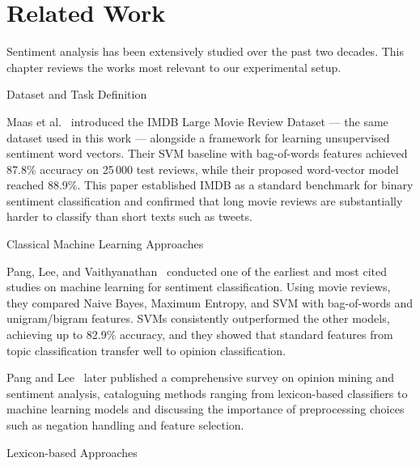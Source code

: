 \documentclass[12pt,reqno,twoside]{amsbook}
\makeatletter
\def\section{\@startsection{section}{1}%
      \z@{.5\linespacing\@plus.7\linespacing}{.25\linespacing}%
      {\normalfont\bfseries\flushleft}}
\theoremstyle{plain}
\numberwithin{equation}{chapter}
\numberwithin{section}{chapter}
\makeatother
\begin{document}
\chapter{Related Work}\label{ch:related}

\noindent Sentiment analysis has been extensively studied over the past two decades.
This chapter reviews the works most relevant to our experimental setup.

\section{Dataset and Task Definition}

\noindent Maas et al.~\cite{maas2011} introduced the IMDB Large Movie Review
Dataset --- the same dataset used in this work --- alongside a framework for
learning unsupervised sentiment word vectors.
Their SVM baseline with bag-of-words features achieved 87.8\% accuracy on
25\,000 test reviews, while their proposed word-vector model reached 88.9\%.
This paper established IMDB as a standard benchmark for binary sentiment
classification and confirmed that long movie reviews are substantially harder
to classify than short texts such as tweets.

\section{Classical Machine Learning Approaches}

\noindent Pang, Lee, and Vaithyanathan~\cite{pang2002} conducted one of the
earliest and most cited studies on machine learning for sentiment classification.
Using movie reviews, they compared Naive Bayes, Maximum Entropy, and SVM with
bag-of-words and unigram/bigram features.
SVMs consistently outperformed the other models, achieving up to 82.9\% accuracy,
and they showed that standard features from topic classification transfer well to
opinion classification.

Pang and Lee~\cite{pang2008} later published a comprehensive survey on opinion
mining and sentiment analysis, cataloguing methods ranging from lexicon-based
classifiers to machine learning models and discussing the importance of
preprocessing choices such as negation handling and feature selection.

\section{Lexicon-based Approaches}
\end{document}
